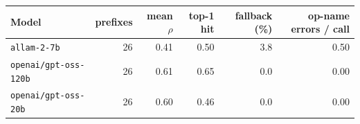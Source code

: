 \begin{tabular}{@{}lrrrrr@{}}
\toprule
Model & prefixes & mean $\rho$ & top-1 hit & fallback (\%) & op-name errors / call\\
\midrule
\texttt{allam-2-7b} & 26 & 0.41 & 0.50 & 3.8 & 0.50\\
\texttt{openai/gpt-oss-120b} & 26 & 0.61 & 0.65 & 0.0 & 0.00\\
\texttt{openai/gpt-oss-20b} & 26 & 0.60 & 0.46 & 0.0 & 0.00\\
\bottomrule
\end{tabular}
